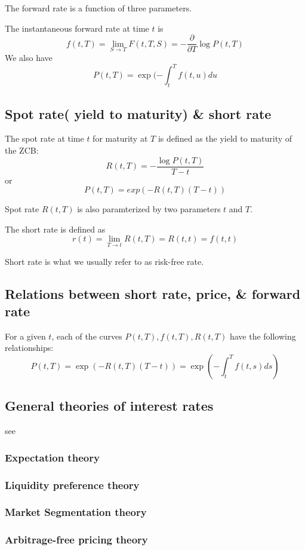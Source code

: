 \documentclass[a4paper,13pt]{report}
\begin{document}
The forward rate is a function of three parameters. 


The instantaneous forward rate at time $t$ is
$$f(t,T) = \lim_{S\rightarrow T} F(t,T,S) = -\frac{\partial}{\partial T} \log P(t,T)$$
We also have
$$P(t,T) = \exp(-\int_t^T f(t,u)du$$


\subsection{Spot rate( yield to maturity) \& short rate}
The spot rate at time $t$ for maturity at $T$ is defined as the yield to maturity of the ZCB:
$$R(t,T)=-\frac{\log P(t,T)}{T-t}$$ or
$$P(t,T) = exp(-R(t,T)(T-t))$$

Spot rate $R(t,T)$ is also paramterized by two parameters $t$ and $T$.


The short rate is defined as
$$r(t) = \lim_{T\rightarrow t} R(t,T) = R(t,t) = f(t,t)$$

Short rate is what we usually refer to as risk-free rate. 

\subsection{Relations between short rate, price, \& forward rate}
For a given $t$, each of the curves $P(t,T),f(t,T),R(t,T)$ have the following relationships:
$$P(t,T) = \exp(-R(t,T)(T-t))=\exp(-\int_t^T f(t,s)ds)$$

\subsection{General theories of interest rates}
see \cite{cairns2004interest}
\subsubsection{Expectation theory}
\subsubsection{Liquidity preference theory}
\subsubsection{Market Segmentation theory}
\subsubsection{Arbitrage-free pricing theory}
\end{document}
